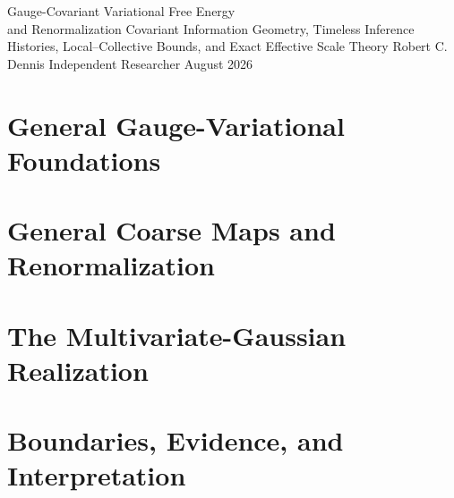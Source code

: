 \documentclass[11pt,letterpaper]{report}
\begin{document}
\hypersetup{pageanchor=false}
\makereporttitle
  {Gauge-Covariant Variational Free Energy\\and Renormalization}
  {Covariant Information Geometry, Timeless Inference Histories, Local--Collective Bounds, and Exact Effective Scale Theory}
  {Robert C. Dennis}
  {Independent Researcher}
  {August 2026}

\hypersetup{pageanchor=true}
\tableofcontents
\listoftables
\clearpage
{}

\part{General Gauge-Variational Foundations}










\part{General Coarse Maps and Renormalization}





\part{The Multivariate-Gaussian Realization}







\part{Boundaries, Evidence, and Interpretation}



\appendix






\end{document}
